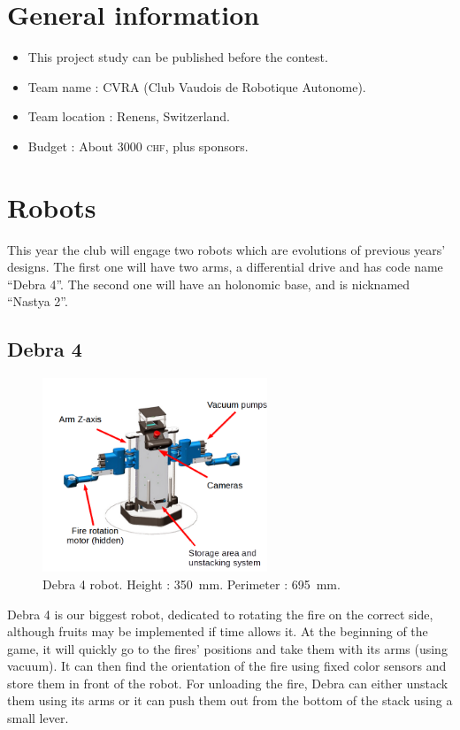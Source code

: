 \documentclass[a4paper]{paper}
\begin{document}


\section{General information}
\begin{itemize}
    \item This project study can be published before the contest.
    \item Team name : CVRA (Club Vaudois de Robotique Autonome).
    \item Team location : Renens, Switzerland.
    \item Budget : About 3000 \textsc{chf}, plus sponsors.
\end{itemize}

\section{Robots}
This year the club will engage two robots which are evolutions of previous years' designs.
The first one will have two arms, a differential drive and has code name ``Debra 4''.
The second one will have an holonomic base, and is nicknamed ``Nastya 2''.

\subsection{Debra 4}
\begin{figure}[h]
    \begin{center}
        \includegraphics[width=0.6\textwidth]{images/debra_explained}
        \caption{Debra 4 robot.
            Height : \SI{350}{\milli\meter}.
            Perimeter : \SI{695}{\milli\meter}.
        }
        \label{fig:balise}
    \end{center}
\end{figure}
Debra 4 is our biggest robot, dedicated to rotating the fire on the correct side, although fruits may be implemented if time allows it.
At the beginning of the game, it will quickly go to the fires' positions and take them with its arms (using vacuum).
It can then find the orientation of the fire using fixed color sensors and store them in front of the robot.
For unloading the fire, Debra can either unstack them using its arms or it can push them out from the bottom of the stack using a small lever.
\end{document}
